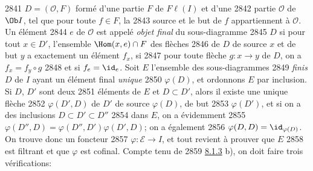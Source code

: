   2841	$D=(\mathcal{O},F)$ formé d'une partie $F$ de $F\ell(I)$ et d'une
  2842	partie $\mathcal{O}$ de $\Ob I$, tel que pour toute $f\in F$, la
  2843	source et le but de $f$ appartiennent à $\mathcal{O}$. Un élément
  2844	$e$ de $\mathcal{O}$ est appelé \emph{objet final} du sous-diagramme
  2845	$D$ si pour tout $x\in D'$, l'ensemble $\Hom(x,e)\cap F$ des flèches
  2846	de $D$ de source $x$ et de but $y$ a exactement un élément $f_x$, si
  2847	pour toute flèche $g:x\rightarrow y$ de $D$, on a $f_x=f_y\circ g$
  2848	et si $f_e=\id_e$. Soit $E$ l'ensemble des sous-diagrammes
  2849	\emph{finis} $D$ de $I$ ayant un élément final \emph{unique}
  2850	$\varphi(D)$, et ordonnons $E$ par inclusion. Si $D$, $D'$ sont deux
  2851	éléments de $E$ et $D\subset D'$, alors il existe une unique flèche
  2852	$\varphi(D',D)$ de $D'$ de source $\varphi(D)$, de but
  2853	$\varphi(D')$, et si on a des inclusions $D\subset D'\subset D''$
  2854	dans $E$, on a évidemment
  2855	$\varphi(D'',D)=\varphi(D'',D')\varphi(D',D)$; on a également
  2856	$\varphi(D,D)=\id_{\varphi(D)}$. On trouve donc un foncteur
  2857	$\varphi:ℰ\rightarrow I$, et tout revient à prouver que $E$
  2858	est filtrant et que $\varphi$ est cofinal. Compte tenu de
  2859	\hyperref[I.prop8.1.3]{8.1.3} b), on doit faire trois vérifications:
